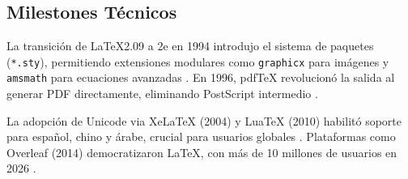 \subsection{Milestones Técnicos}
La transición de \LaTeX 2.09 a 2e en 1994 introdujo el sistema de paquetes (\texttt{*.sty}), permitiendo extensiones modulares como \texttt{graphicx} para imágenes y \texttt{amsmath} para ecuaciones avanzadas \cite{latex_project}. En 1996, pdfTeX revolucionó la salida al generar PDF directamente, eliminando PostScript intermedio \cite{wiki_latex}.

La adopción de Unicode via XeLaTeX (2004) y LuaTeX (2010) habilitó soporte para español, chino y árabe, crucial para usuarios globales \cite{wiki_latex}. Plataformas como Overleaf (2014) democratizaron \LaTeX, con más de 10 millones de usuarios en 2026 \cite{overleaf_whatislatex}.